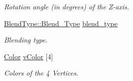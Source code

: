 \begin{DoxyCompactItemize}
\begin{DoxyCompactList}\small\item\em Rotation angle (in degrees) of the Z-\/axis. \item\end{DoxyCompactList}\item 
\hypertarget{class_f2_c_1_1_sprite_base_a24e4acd632808884f0c5e573afbdbb4a}{
\hyperlink{namespace_f2_c_1_1_blend_type_a582fe2d83fb813041785794568e5a414}{BlendType::Blend\_\-Type} \hyperlink{class_f2_c_1_1_sprite_base_a24e4acd632808884f0c5e573afbdbb4a}{blend\_\-type}}
\label{class_f2_c_1_1_sprite_base_a24e4acd632808884f0c5e573afbdbb4a}

\begin{DoxyCompactList}\small\item\em Blending type. \item\end{DoxyCompactList}\item 
\hyperlink{class_f2_c_1_1_color}{Color} \hyperlink{class_f2_c_1_1_sprite_base_ae05d180666e3750a5d5f909f04e686c4}{vColor} \mbox{[}4\mbox{]}
\begin{DoxyCompactList}\small\item\em Colors of the 4 Vertices. \item\end{DoxyCompactList}\end{DoxyCompactItemize}
